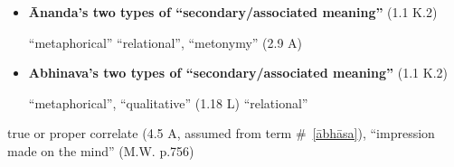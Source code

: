 \documentclass[10pt]{article}
\begin{document}
\begin{multicols}{2}
\begin{enumerate}[
			leftmargin=0em,
			rightmargin=0em,
		]
		\begin{itemize}
			\item \textbf{Ānanda's two types of ``secondary\-/associated meaning''} (1.1 K.2)
			      \begin{enumerate}
				       ``metaphorical''
				       ``relational'', ``metonymy'' (2.9 A)
			      \end{enumerate}

			\item \textbf{Abhinava's two types of ``secondary\-/associated meaning''} (1.1 K.2)
			      \begin{enumerate}
				       ``metaphorical'', ``qualitative'' (1.18 L)
				       ``relational''
			      \end{enumerate}
		\end{itemize}

		 true or proper correlate (4.5 A, assumed from term \#~\ref{ābhāsa}),
		``impression made on the mind'' (M.W. p.756)


\end{enumerate}
\end{multicols}
\end{document}
